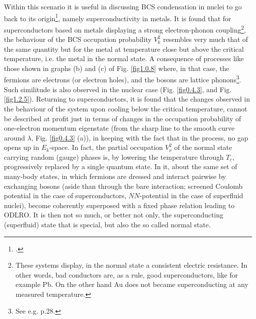  Within this scenario it is useful in discussing BCS condensation in nuclei to go back to its origin\footnote{\cite{Bohr:58}.}, namely superconductivity in metals. It is found that for superconductors based on metals displaying a strong electron-phonon coupling\footnote{These systems display, in the normal state a consistent electric resistance. In other words, bad conductors are, as a rule, good superconductors, like for example Pb. On the other hand Au does not became superconducting at any measured temperature.}, the behaviour of the BCS occupation probability $V^2_k$ resembles very much that of the same quantity but for the metal at temperature close but above the critical temperature, i.e. the metal in the normal state. A consequence of processes like those shown in graphs (b) and (c) of Fig. \ref{fig1.0.8} where, in that case, the fermions are electrons (or electron holes), and the bosons are lattice phonons\footnote{See e.g. \cite{Tinkham:96} p.28.}. Such similitude is also observed in the nuclear case (Fig. \ref{fig0.4.3}, and Fig. \ref{fig1.2.5}). Returning to superconductors, it is found that the changes observed in the behaviour of the system upon cooling below the critical temperature, cannot be described at profit just in terms of changes in the occupation probability of one-electron momentum eigenstate (from the sharp line to the smooth curve around $\lambda$, Fig. \ref{fig0.4.3} (a)), in keeping with the fact that in the process, no gap opens up in $E_k$-space. In fact, the partial occupation $V^2_\nu$ of the normal state carrying random (gauge) phases is, by lowering the temperature through $T_c$, progressively replaced by a single quantum state. In it, about the same set of many-body states, in which fermions are dressed and interact pairwise by exchanging  bosons (aside than through the bare interaction; screened Coulomb potential in the case of superconductors, $NN$-potential in the case of superfluid nuclei), become coherently superposed with a fixed phase relation leading to ODLRO. It is then not so much, or better not only, the superconducting (superfluid) state that is special, but also the so called normal state.
 
